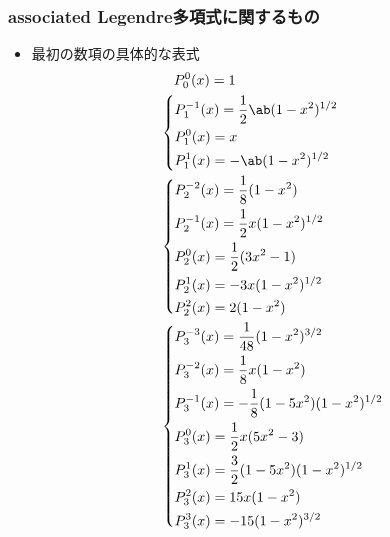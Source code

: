 \subsubsection{associated Legendre多項式に関するもの}
\begin{itemize}%
  \item 最初の数項の具体的な表式
    \begin{align*}%
      &\hs{1em}P_0^0(x) = 1\\
      &\begin{dcases}
        P_{1}^{-1}(x) = \frac{1}{2}\ab(1-x^2)^{1/2}\\
        P_1^0 (x) = x\\
        P_1^1 (x) = -\ab(1-x^2)^{1/2}\\
      \end{dcases}\\
      &\begin{dcases}
        P_2^{-2} (x) = \frac{1}{8}(1-x^2)\\
        P_2^{-1}(x) = \frac{1}{2}x(1-x^2)^{1/2}\\
        P_2^0(x) = \frac{1}{2}(3x^2-1)\\
        P_2^1(x) = -3x(1-x^2)^{1/2}\\
        P_2^2(x) = 2(1-x^2)
      \end{dcases}\\
      &\begin{dcases}%
        P_3^{-3}(x) = \frac{1}{48} (1-x^2)^{3/2}\\
        P_3^{-2}(x) = \frac{1}{8}x(1-x^2)\\
        P_3^{-1}(x) = -\frac{1}{8}(1-5x^2)(1-x^2)^{1/2}\\
        P_3^0(x) = \frac{1}{2}x(5x^2-3)\\
        P_3^1(x) = \frac{3}{2}(1-5x^2)(1-x^2)^{1/2}\\
        P_3^2(x) = 15x(1-x^2)\\
        P_3^3(x) = -15(1-x^2)^{3/2}
      \end{dcases}%
    \end{align*}
\end{itemize}%

